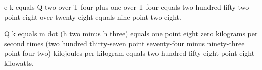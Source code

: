 e k equals Q two over T four plus one over T four equals two hundred fifty-two point eight over twenty-eight equals nine point two eight. 

Q k equals m dot (h two minus h three) equals one point eight zero kilograms per second times (two hundred thirty-seven point seventy-four minus ninety-three point four two) kilojoules per kilogram equals two hundred fifty-eight point eight kilowatts.